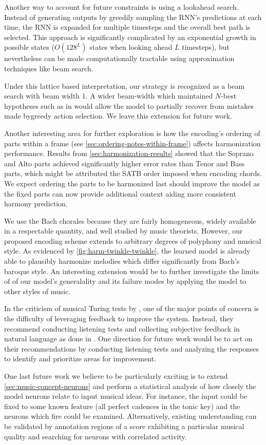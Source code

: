 
Another way to account for future constraints is using a lookahead
search. Instead of generating outputs by greedily sampling the RNN's
predictions at each time, the RNN is expanded for multiple timesteps and
the overall best path is selected. This approach is significantly
complicated by an exponential growth in possible states ($O(128^L)$
states when looking ahead $L$ timesteps), but nevertheless can be made
computationally tractable using approximation techniques like
beam search\citep{norvig1992paradigms}.

Under this lattice based interpretation, our strategy is recognized as a beam
search with beam width $1$. A wider beam-width which maintained $N$-best
hypotheses such as in \citet{liu2014efficient} would allow the model to
partially recover from mistakes made bygreedy action selection. We leave this
extension for future work.


Another interesting area for further exploration is how the encoding's ordering
of parts within a frame (see \vref{sec:ordering-notes-within-frame}) affects
harmonization performance. Results from \vref{sec:harmonization-results} showed
that the Soprano and Alto parts achieved significantly higher error rates than
Tenor and Bass parts, which might be attributed the SATB order imposed when
encoding chords. We expect ordering the parts to be harmonized last should
improve the model as the fixed parts can now provide additional context aiding
more consistent harmony
prediction.

We use the Bach chorales because they are fairly homogeneous, widely available
in a respectable quantity, and well studied by music theorists. However, our
proposed encoding scheme extends to arbitrary degrees of polyphony and musical
style. As evidenced by \vref{fig:harm-twinkle-twinkle}, the learned model is
already able to plausibly harmonize melodies which differ significantly from
Bach's baroque style. An interesting extension would be to further investigate
the limits of of our model's generalality and its failure modes by applying
the model to other styles of music.

In the criticism of musical Turing tests by \citet{ariza2009interrogator}, one
of the major points of concern is the difficulty of leveraging feedback to
improve the system. Instead, they recommend conducting listening tests and
collecting subjective feedback in natural language as done in
\citet{collins2016developing}. One direction for future work would be to
act on their recommendations by conducting listening tests and analyzing
the responses to identify and prioritize areas for improvement.

One last future work we believe to be particularly exciting is to extend
\vref{sec:music-concept-neurons} and perform a statistical analysis of how
closely the model neurons relate to input musical ideas. For instance, the
input could be fixed to some known feature (\eg all perfect cadences in the
tonic key) and the neurons which fire could be examined. Alternatively,
existing understanding can be validated by annotation regions of a score
exhibiting a particular musical quality and searching for neurons with
correlated activity.
